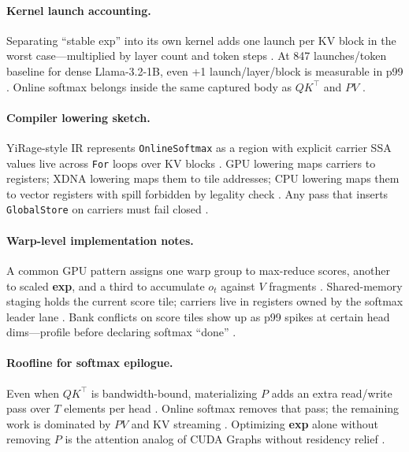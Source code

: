 \paragraph{Kernel launch accounting.} Separating ``stable exp'' into its own kernel adds one launch per KV block in the worst case---multiplied by layer count and token steps \citep{taxbreak2026,nvidia2024cudagraphs}. At 847 launches/token baseline for dense Llama-3.2-1B, even +1 launch/layer/block is measurable in p99 \citep{taxbreak2026,memoryfloor2026}. Online softmax belongs inside the same captured body as $QK^\top$ and $PV$ \citep{dao2023flashdecoding,yirage2026}.

\paragraph{Compiler lowering sketch.} YiRage-style IR represents \texttt{OnlineSoftmax} as a region with explicit carrier SSA values live across \texttt{For} loops over KV blocks \citep{yirage2026,chen2020compilerbasedhardw}. GPU lowering maps carriers to registers; XDNA lowering maps them to tile addresses; CPU lowering maps them to vector registers with spill forbidden by legality check \citep{amd2024aie,dlbook}. Any pass that inserts \texttt{GlobalStore} on carriers must fail closed \citep{memoryfloor2026}.

\paragraph{Warp-level implementation notes.} A common GPU pattern assigns one warp group to max-reduce scores, another to scaled \textbf{exp}, and a third to accumulate $o_t$ against $V$ fragments \citep{semianalysis2024tma,nvidia2022hopper}. Shared-memory staging holds the current score tile; carriers live in registers owned by the softmax leader lane \citep{dao2022flashattention}. Bank conflicts on score tiles show up as p99 spikes at certain head dims---profile before declaring softmax ``done'' \citep{patel2025llminference,taxbreak2026}.

\paragraph{Roofline for softmax epilogue.} Even when $QK^\top$ is bandwidth-bound, materializing $P$ adds an extra read/write pass over $T$ elements per head \citep{memoryfloor2026,dlbook}. Online softmax removes that pass; the remaining work is dominated by $PV$ and KV streaming \citep{dao2022flashattention,dao2023flashdecoding}. Optimizing \textbf{exp} alone without removing $P$ is the attention analog of CUDA Graphs without residency relief \citep{memoryfloor2026,nvidia2024cudagraphs}.

